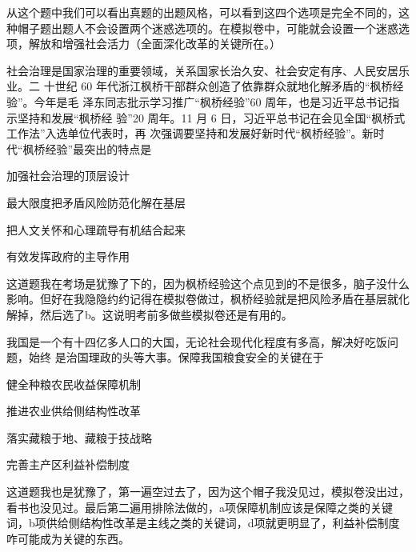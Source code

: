 \documentclass[lang=cn,blue,10pt,scheme=chinese,twocol]{zznote}
\begin{document}
\begin{postulate}
	从这个题中我们可以看出真题的出题风格，可以看到这四个选项是完全不同的，这种帽子题出题人不会设置两个迷惑选项的。在模拟卷中，可能就会设置一个迷惑选项，解放和增强社会活力（全面深化改革的关键所在。）
\end{postulate}

\begin{exercise}社会治理是国家治理的重要领域，关系国家长治久安、社会安定有序、人民安居乐业。二 十世纪 60 年代浙江枫桥干部群众创造了依靠群众就地化解矛盾的“枫桥经验”。今年是毛 泽东同志批示学习推广“枫桥经验”60 周年，也是习近平总书记指示坚持和发展“枫桥经 验”20 周年。11 月 6 日，习近平总书记在会见全国“枫桥式工作法”入选单位代表时，再 次强调要坚持和发展好新时代“枫桥经验”。新时代“枫桥经验”最突出的特点是
	\begin{choice}
		\item 加强社会治理的顶层设计
		\item 最大限度把矛盾风险防范化解在基层
		\item 把人文关怀和心理疏导有机结合起来
		\item 有效发挥政府的主导作用
	\end{choice}
\end{exercise}
\begin{solution}
	这道题我在考场是犹豫了下的，因为枫桥经验这个点见到的不是很多，脑子没什么影响。但好在我隐隐约约记得在模拟卷做过，枫桥经验就是把风险矛盾在基层就化解掉，然后选了b。这说明考前多做些模拟卷还是有用的。
\end{solution}


\begin{exercise}我国是一个有十四亿多人口的大国，无论社会现代化程度有多高，解决好吃饭问题，始终 是治国理政的头等大事。保障我国粮食安全的关键在于
	\begin{choice}
		\item 健全种粮农民收益保障机制
		\item 推进农业供给侧结构性改革
		\item 落实藏粮于地、藏粮于技战略
		\item 完善主产区利益补偿制度
	\end{choice}
\end{exercise}
\begin{solution}
	这道题我也是犹豫了，第一遍空过去了，因为这个帽子我没见过，模拟卷没出过，看书也没见过。最后第二遍用排除法做的，a项保障机制应该是保障之类的关键词，b项供给侧结构性改革是主线之类的关键词，d项就更明显了，利益补偿制度咋可能成为关键的东西。
\end{solution}
\end{document}
